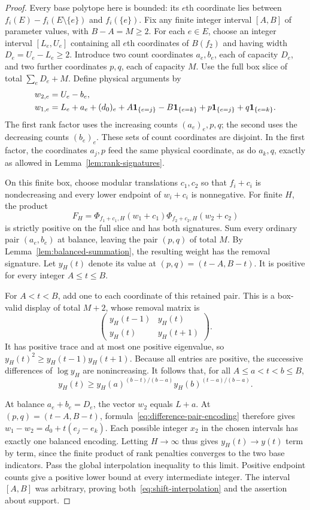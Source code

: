 \begin{proof}
Every base polytope here is bounded: its $e$th coordinate lies
between $f_i(E)-f_i(E\setminus\{e\})$ and $f_i(\{e\})$.
Fix any finite integer interval $[A,B]$ of parameter values,
with $B-A=M\ge2$.  For each $e\in E$, choose an integer interval
$[L_e,U_e]$ containing all $e$th coordinates of $B(f_2)$ and
having width $D_e=U_e-L_e\ge2$.
Introduce two count coordinates $a_e,b_e$, each of capacity $D_e$,
and two further coordinates $p,q$, each of capacity $M$.
Use the full box slice of total $\sum_eD_e+M$.
Define physical arguments by
\begin{align}
 w_{2,e}&=U_e-b_e,\notag\\
 w_{1,e}&=L_e+a_e+(d_0)_e
             +A\mathbf 1_{\{e=j\}}-B\mathbf 1_{\{e=k\}}
             +p\mathbf 1_{\{e=j\}}+q\mathbf 1_{\{e=k\}}.
 \label{eq:difference-pair-encoding}
\end{align}
The first rank factor uses the increasing counts $(a_e)_e,p,q$;
the second uses the decreasing counts $(b_e)_e$.
These sets of count coordinates are disjoint.
In the first factor, the coordinates $a_j,p$ feed the same physical
coordinate, as do $a_k,q$, exactly as allowed in
Lemma~\ref{lem:rank-signatures}.

On this finite box, choose modular translations $c_1,c_2$ so that
$f_i+c_i$ is nondecreasing and every lower endpoint of $w_i+c_i$
is nonnegative.  For finite $H$, the product
\[
 F_H=\Phi_{f_1+c_1,H}(w_1+c_1)
             \Phi_{f_2+c_2,H}(w_2+c_2)
\]
is strictly positive on the full slice and has both signatures.
Sum every ordinary pair $(a_e,b_e)$ at balance, leaving the pair
$(p,q)$ of total $M$.  By Lemma~\ref{lem:balanced-summation},
the resulting weight has the removal signature.
Let $y_H(t)$ denote its value at $(p,q)=(t-A,B-t)$.
It is positive for every integer $A\le t\le B$.

For $A<t<B$, add one to each coordinate of this retained pair.
This is a box-valid display of total $M+2$, whose removal matrix is
\[
 \begin{pmatrix}
  y_H(t-1)&y_H(t)\\y_H(t)&y_H(t+1)
 \end{pmatrix}.
\]
It has positive trace and at most one positive eigenvalue, so
$y_H(t)^2\ge y_H(t-1)y_H(t+1)$.
Because all entries are positive, the successive differences of
$\log y_H$ are nonincreasing.  It follows that, for all
$A\le a<t<b\le B$,
\[
 y_H(t)\ge y_H(a)^{(b-t)/(b-a)}
                 y_H(b)^{(t-a)/(b-a)}.
\]

At balance $a_e+b_e=D_e$, the vector $w_2$ equals $L+a$.
At $(p,q)=(t-A,B-t)$, formula~\eqref{eq:difference-pair-encoding}
therefore gives $w_1-w_2=d_0+t(e_j-e_k)$.
Each possible integer $x_2$ in the chosen intervals has exactly
one balanced encoding.  Letting $H\to\infty$ thus gives
$y_H(t)\to y(t)$ term by term, since the finite product of rank
penalties converges to the two base indicators.
Pass the global interpolation inequality to this limit.
Positive endpoint counts give a positive lower bound at every
intermediate integer.  The interval $[A,B]$ was arbitrary, proving
both~\eqref{eq:shift-interpolation} and the assertion about support.
\end{proof}

